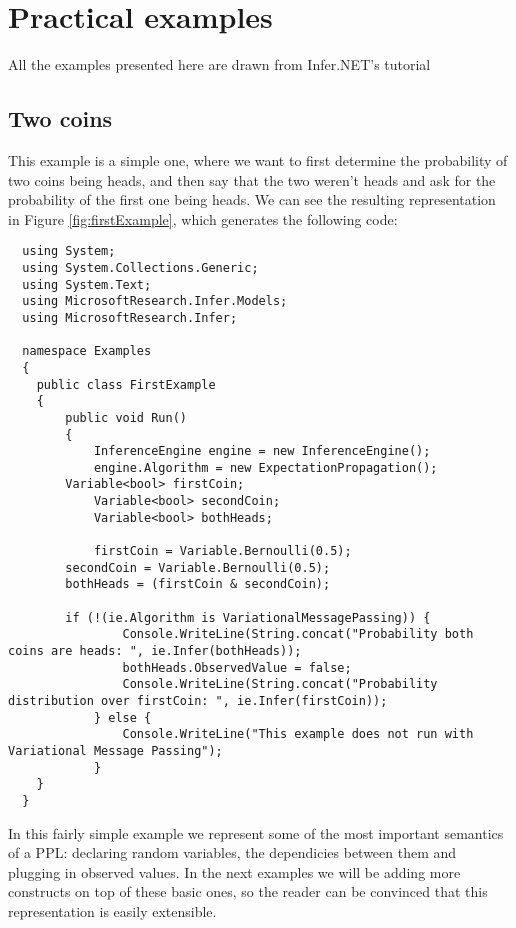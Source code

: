 \chapter{Practical examples}\label{chap:chap4}

All the examples presented here are drawn from Infer.NET's tutorial
\cite{InferNET14t}

\section{Two coins}

This example is a simple one, where we want to first determine the probability of
two coins being heads, and then say that the two weren't heads and ask for the
probability of the first one being heads.
We can see the resulting representation in Figure \ref{fig:firstExample}, which generates the following code:

\begin{lstlisting}
  using System;
  using System.Collections.Generic;
  using System.Text;
  using MicrosoftResearch.Infer.Models;
  using MicrosoftResearch.Infer;

  namespace Examples
  {
  	public class FirstExample
  	{
  		public void Run()
  		{
  			InferenceEngine engine = new InferenceEngine();
  			engine.Algorithm = new ExpectationPropagation();
        Variable<bool> firstCoin;
  			Variable<bool> secondCoin;
  			Variable<bool> bothHeads;

  			firstCoin = Variable.Bernoulli(0.5);
        secondCoin = Variable.Bernoulli(0.5);
        bothHeads = (firstCoin & secondCoin);

        if (!(ie.Algorithm is VariationalMessagePassing)) {
  				Console.WriteLine(String.concat("Probability both coins are heads: ", ie.Infer(bothHeads));
  				bothHeads.ObservedValue = false;
  				Console.WriteLine(String.concat("Probability distribution over firstCoin: ", ie.Infer(firstCoin));
  			} else {
  				Console.WriteLine("This example does not run with Variational Message Passing");
    		}
  	}
  }
\end{lstlisting}

In this fairly simple example we represent some of the most important semantics
of a PPL: declaring random variables, the dependicies between them and plugging
in observed values. In the next examples we will be adding more constructs on
top of these basic ones, so the reader can be convinced that this representation
is easily extensible.


